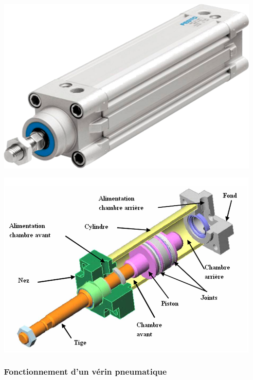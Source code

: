 \documentclass[10pt]{article}
\begin{document}
\begin{minipage}[c]{.44\textwidth}
\begin{center}
\includegraphics[width=.6\textwidth]{images/verin_festo}
\end{center}

\begin{center}
\includegraphics[width=\textwidth]{images/Fig_03_Verin}
\end{center}
\end{minipage}


\subsubsection{Fonctionnement d'un vérin pneumatique}
\end{document}
